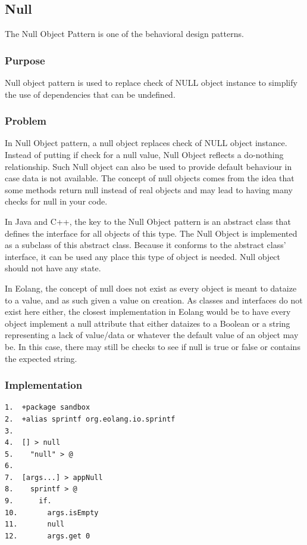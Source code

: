 \documentclass[sigplan,12pt,nonacm=true,review=false]{acmart}
\begin{document}
\subsection{Null}
The Null Object Pattern is one of the behavioral design patterns.

\subsubsection{Purpose}
Null object pattern is used to replace check of NULL object instance to simplify the use of dependencies that can be undefined.

\subsubsection{Problem}
In Null Object pattern, a null object replaces check of NULL object instance. Instead of putting if check for a null value, Null Object reflects a do-nothing relationship. Such Null object can also be used to provide default behaviour in case data is not available. The concept of null objects comes from the idea that some methods return null instead of real objects and may lead to having many checks for null in your code. 


In Java and C++, the key to the Null Object pattern is an abstract class that defines the interface for all objects of this type. The Null Object is implemented as a subclass of this abstract class. Because it conforms to the abstract class' interface, it can be used any place this type of object is needed. Null object should not have any state.


In Eolang, the concept of null does not exist as every object is meant to dataize to a value, and as such given a value on creation. As classes and interfaces do not exist here either, the closest implementation in Eolang would be to have every object implement a null attribute that either dataizes to a Boolean or a string representing a lack of value/data or whatever the default value of an object may be. In this case, there may still be checks to see if null is true or false or contains the expected string.

\subsubsection{Implementation}
\begin{verbatim}
1.	+package sandbox
2.	+alias sprintf org.eolang.io.sprintf
3.	
4.	[] > null
5.	  "null" > @
6.	
7.	[args...] > appNull
8.	  sprintf > @
9.	    if.
10.	      args.isEmpty
11.	      null
12.	      args.get 0 

\end{verbatim}
\end{document}
